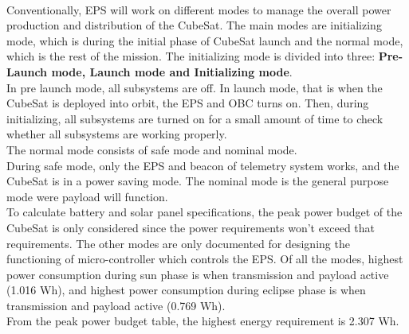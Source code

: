\\
 Conventionally, EPS will work on different modes to manage the overall power production and distribution of the CubeSat. The main modes are initializing mode, which is during the initial phase of CubeSat launch and the normal mode, which is the rest of the mission. The initializing mode is divided into three: {\bf Pre- Launch mode, Launch mode and Initializing mode}. 
 \\In pre launch mode, all subsystems are off. In launch mode, that is when the CubeSat is deployed into orbit, the EPS and OBC turns on. Then, during initializing, all subsystems are turned on for a small amount of time to check whether all subsystems are working properly. \\The normal mode consists of safe mode and nominal mode. \\During safe mode, only the EPS and beacon of telemetry system works, and the CubeSat is in a power saving mode. The nominal mode is the general purpose mode were payload will function.
 \\
 To calculate battery and solar panel specifications, the peak power budget of the CubeSat is only considered since the power requirements won’t exceed that requirements. The other modes are only documented for designing the functioning of micro-controller which controls the EPS. Of all the modes, highest power consumption during sun phase is when transmission and payload active (1.016 Wh), and highest power consumption during eclipse phase is when transmission and payload active (0.769 Wh).
 \\
 From the peak power budget table, the highest energy requirement is 2.307 Wh.
 
